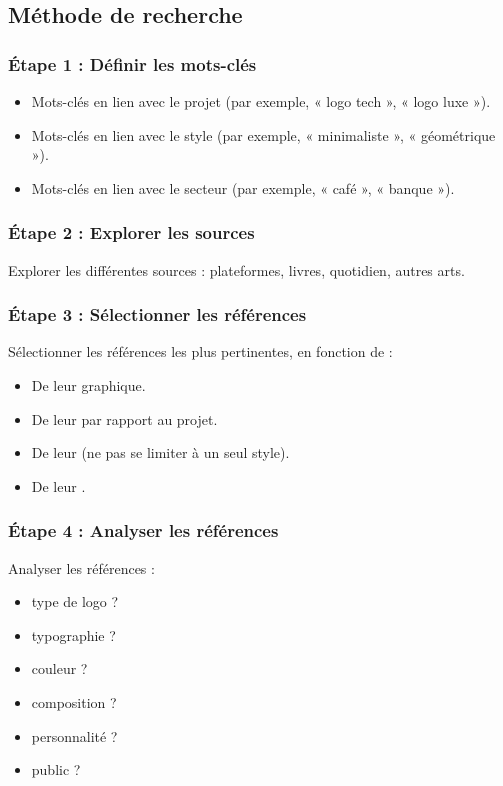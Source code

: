 \subsection{Méthode de recherche}

\subsubsection{Étape 1 : Définir les mots-clés}

\begin{itemize}
    \item Mots-clés en lien avec le projet (par exemple, « logo tech », « logo luxe »).
    \item Mots-clés en lien avec le style (par exemple, « minimaliste », « géométrique »).
    \item Mots-clés en lien avec le secteur (par exemple, « café », « banque »).
\end{itemize}

\subsubsection{Étape 2 : Explorer les sources}

Explorer les différentes sources : plateformes, livres, quotidien, autres arts.

\subsubsection{Étape 3 : Sélectionner les références}

Sélectionner les références les plus pertinentes, en fonction de :

\begin{itemize}
    \item De leur  graphique.
    \item De leur  par rapport au projet.
    \item De leur  (ne pas se limiter à un seul style).
    \item De leur .
\end{itemize}

\subsubsection{Étape 4 : Analyser les références}

Analyser les références :

\begin{itemize}
    \item {} type de logo ?
    \item {} typographie ?
    \item {} couleur ?
    \item {} composition ?
    \item {} personnalité ?
    \item {} public ?
\end{itemize}

